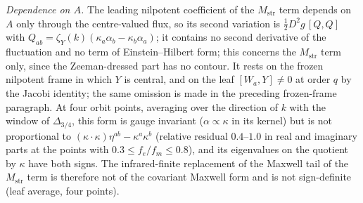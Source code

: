 \emph{Dependence on \(A\).} The leading nilpotent coefficient of the \(M_{\mathrm{str}}\) term depends on \(A\) only through the centre-valued flux, so its second variation is \(\tfrac12D^2g\,[Q,Q]\) with \(Q_{ab}=\zeta_Y(k)(\kappa_a\alpha_b-\kappa_b\alpha_a)\); it contains no second derivative of the fluctuation and no term of Einstein--Hilbert form; this concerns the \(M_{\mathrm{str}}\) term only, since the Zeeman-dressed part has no contour. It rests on the frozen nilpotent frame in which \(Y\) is central, and on the leaf \([W_a,Y]\ne0\) at order \(q\) by the Jacobi identity; the same omission is made in the preceding frozen-frame paragraph. At four orbit points, averaging over the direction of \(k\) with the window of \(\Delta_{3/4}\), this form is gauge invariant (\(\alpha\propto\kappa\) in its kernel) but is not proportional to \((\kappa\cdot\kappa)\eta^{ab}-\kappa^a\kappa^b\) (relative residual \(0.4\)--\(1.0\) in real and imaginary parts at the points with \(0.3\le f_e/f_m\le0.8\)), and its eigenvalues on the quotient by \(\kappa\) have both signs. The infrared-finite replacement of the Maxwell tail of the \(M_{\mathrm{str}}\) term is therefore not of the covariant Maxwell form and is not sign-definite (leaf average, four points).



